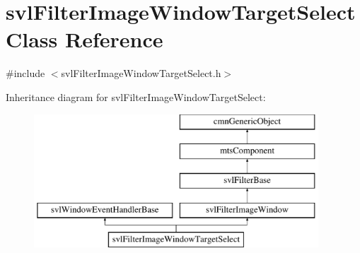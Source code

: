 \hypertarget{classsvl_filter_image_window_target_select}{\section{svl\-Filter\-Image\-Window\-Target\-Select Class Reference}
\label{classsvl_filter_image_window_target_select}
}


{\ttfamily \#include $<$svl\-Filter\-Image\-Window\-Target\-Select.\-h$>$}

Inheritance diagram for svl\-Filter\-Image\-Window\-Target\-Select\-:\begin{figure}[H]
\begin{center}
\leavevmode
\includegraphics[height=5.000000cm]{d7/dd6/classsvl_filter_image_window_target_select}
\end{center}
\end{figure}
